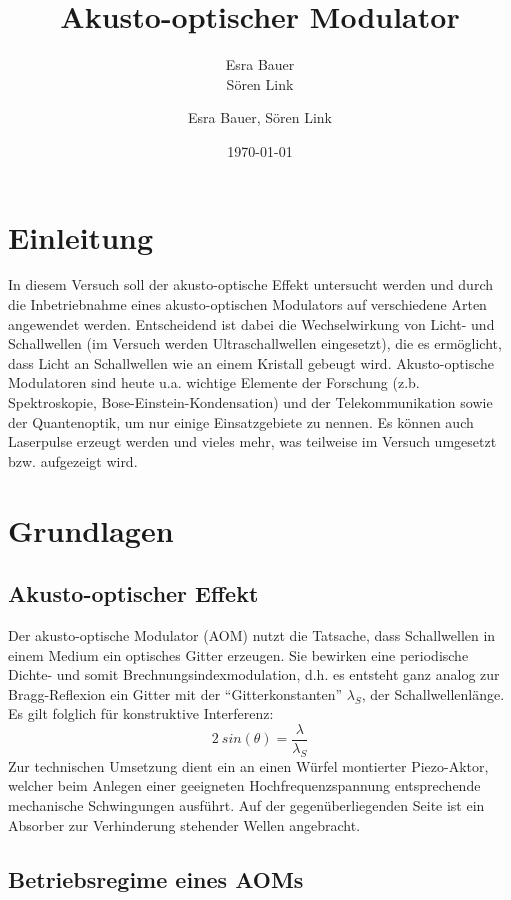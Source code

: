\documentclass[bigchapter,colorback,accentcolor=tud4b,linedtoc,11pt]{tudreport}
\title{Akusto-optischer Modulator}
\subtitle{Esra Bauer  \\Sören Link}
\author{Esra Bauer, Sören Link}
\date{\today}
\begin{document}

\maketitle

\tableofcontents


\chapter{Einleitung}

In diesem Versuch soll der akusto-optische Effekt untersucht werden und durch die Inbetriebnahme eines akusto-optischen Modulators auf verschiedene Arten angewendet werden. Entscheidend ist dabei die Wechselwirkung von Licht- und Schallwellen (im Versuch werden Ultraschallwellen eingesetzt), die es ermöglicht, dass Licht an Schallwellen wie an einem Kristall gebeugt wird. Akusto-optische Modulatoren sind heute u.a. wichtige Elemente der Forschung (z.b. Spektroskopie, Bose-Einstein-Kondensation) und der Telekommunikation sowie der Quantenoptik, um nur einige Einsatzgebiete zu nennen. Es können auch Laserpulse erzeugt werden und vieles mehr, was teilweise im Versuch umgesetzt bzw. aufgezeigt wird.

\chapter{Grundlagen}
\section{Akusto-optischer Effekt}

Der akusto-optische Modulator (AOM) nutzt die Tatsache, dass Schallwellen in einem Medium ein optisches Gitter erzeugen. Sie bewirken eine periodische Dichte- und somit Brechnungsindexmodulation, d.h. es entsteht ganz analog zur Bragg-Reflexion ein Gitter mit der ``Gitterkonstanten'' $\lambda_S$, der Schallwellenlänge. Es gilt folglich für konstruktive Interferenz: 
$$2~sin(\theta) = \frac{\lambda}{\lambda_S}$$ 
Zur technischen Umsetzung dient ein an einen Würfel montierter Piezo-Aktor, welcher beim Anlegen einer geeigneten Hochfrequenzspannung entsprechende mechanische Schwingungen ausführt. Auf der gegenüberliegenden Seite ist ein Absorber zur Verhinderung stehender Wellen angebracht.

\section{Betriebsregime eines AOMs}
\end{document}
